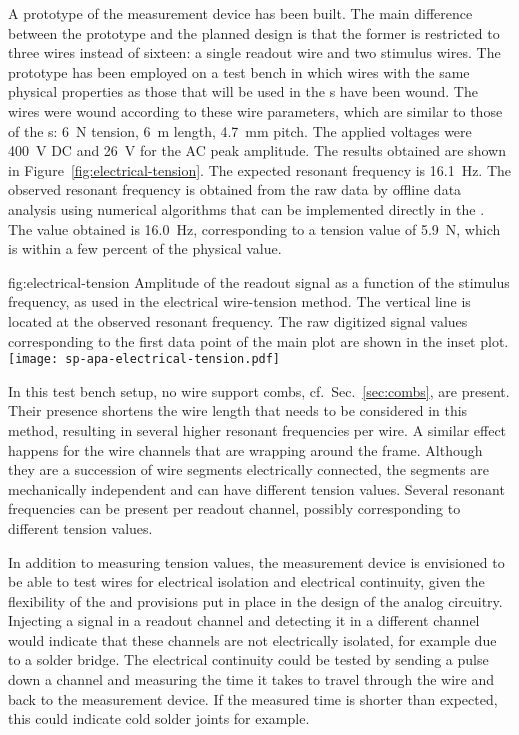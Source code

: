A prototype of the measurement device has been built. The main difference between the prototype and the planned design is that the former is restricted to three wires instead of sixteen: a single readout wire and two stimulus wires. The prototype has been employed on a test bench in which wires with the same physical properties as those that will be used in the s have been wound. The wires were wound according to these wire parameters, which are similar to those of the s: \SI{6}{N} tension, \SI{6}{m} length, \SI{4.7}{mm} pitch. The applied voltages were \SI{400}{V} DC and \SI{26}{V} for the AC peak amplitude. The results obtained are shown in Figure~\ref{fig:electrical-tension}. The expected resonant frequency is \SI{16.1}{Hz}. The observed resonant frequency is obtained from the raw data by offline data analysis using numerical algorithms that can be implemented directly in the . The value obtained is \SI{16.0}{Hz}, corresponding to a tension value of \SI{5.9}{N}, which is within a few percent of the physical value.

\begin{dunefigure}{fig:electrical-tension}
{Amplitude of the readout signal as a function of the stimulus frequency, as used in the electrical wire-tension method. The vertical line is located at the observed resonant frequency. The raw digitized signal values corresponding to the first data point of the main plot are shown in the inset plot.}
\texttt{[image: sp-apa-electrical-tension.pdf]}
\end{dunefigure}

In this test bench setup, no wire support combs, cf.\ Sec.~\ref{sec:combs}, are present. Their presence shortens the wire length that needs to be considered in this method, resulting in several higher resonant frequencies per wire. A similar effect happens for the wire channels that are wrapping around the  frame. Although they are a succession of wire segments electrically connected, the segments are mechanically independent and can have different tension values. Several resonant frequencies can be present per readout channel, possibly corresponding to different tension values.

In addition to measuring tension values, the measurement device is envisioned to be able to test wires for electrical isolation and electrical continuity, given the flexibility of the  and provisions put in place in the design of the analog circuitry. Injecting a signal in a readout channel and detecting it in a different channel would indicate that these channels are not electrically isolated, for example due to a solder bridge. The electrical continuity could be tested by sending a pulse down a channel and measuring the time it takes to travel through the wire and back to the measurement device.  If the measured time is shorter than expected, this could indicate cold solder joints for example.


